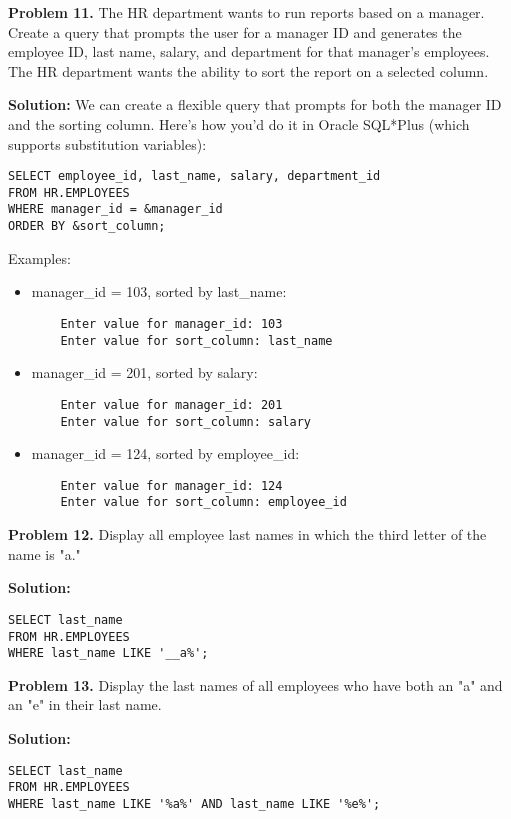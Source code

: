 \documentclass[12pt,a4paper]{article}
\begin{document}
\textbf{Problem 11.} The HR department wants to run reports based on a manager. Create a query that prompts the user for a manager ID and generates the employee ID, last name, salary, and department for that manager's employees. The HR department wants the ability to sort the report on a selected column.

\textbf{Solution:} We can create a flexible query that prompts for both the manager ID and the sorting column. Here's how you'd do it in Oracle SQL*Plus (which supports substitution variables):

\begin{lstlisting}[style=sqlstyle]
SELECT employee_id, last_name, salary, department_id
FROM HR.EMPLOYEES
WHERE manager_id = &manager_id
ORDER BY &sort_column;
\end{lstlisting}

Examples:
\begin{itemize}
    \item manager\_id = 103, sorted by last\_name:
    \begin{verbatim}
    Enter value for manager_id: 103
    Enter value for sort_column: last_name
    \end{verbatim}
    
    \item manager\_id = 201, sorted by salary:
    \begin{verbatim}
    Enter value for manager_id: 201
    Enter value for sort_column: salary
    \end{verbatim}
    
    \item manager\_id = 124, sorted by employee\_id:
    \begin{verbatim}
    Enter value for manager_id: 124
    Enter value for sort_column: employee_id
    \end{verbatim}
\end{itemize}

\textbf{Problem 12.} Display all employee last names in which the third letter of the name is "a."

\textbf{Solution:}
\begin{lstlisting}[style=sqlstyle]
SELECT last_name
FROM HR.EMPLOYEES
WHERE last_name LIKE '__a%';
\end{lstlisting}

\textbf{Problem 13.} Display the last names of all employees who have both an "a" and an "e" in their last name.

\textbf{Solution:}
\begin{lstlisting}[style=sqlstyle]
SELECT last_name
FROM HR.EMPLOYEES
WHERE last_name LIKE '%a%' AND last_name LIKE '%e%';
\end{lstlisting}
\end{document}
